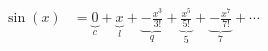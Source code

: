 \documentclass[preview]{standalone}
\begin{document}
\begin{align*}
\sin(x) &= \underbrace{0}_{c} + \underbrace{x}_{l} + \underbrace{-\frac{x^3}{3!}}_{q} + \underbrace{\frac{x^5}{5!}}_{5} + \underbrace{-\frac{x^7}{7!}}_{7} + \cdots
\end{align*}
\end{document}
